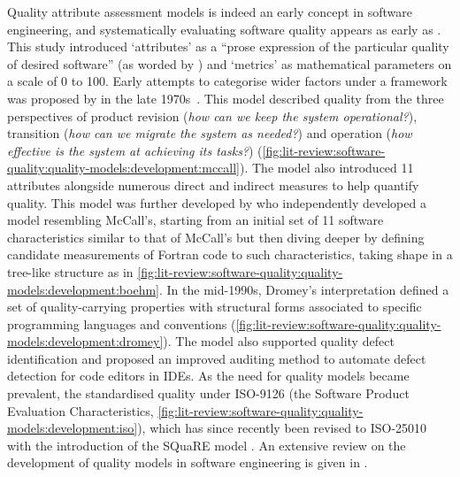 Quality attribute assessment models is indeed an early concept in software engineering, and systematically evaluating software quality appears as early as \citeyear{Rubey:1968fg} \citep{Rubey:1968fg}. This study introduced `attributes' as a ``prose expression of the particular quality of desired software'' (as worded by \citet{Boehm:1978vv}) and `metrics' as mathematical parameters on a scale of 0 to 100. 
Early attempts to categorise wider factors under a framework was proposed by \citeauthor*{McCall:1977uy} in the late 1970s~\citep{McCall:1977wm,Cavano:1978gz}. This model described quality from the three perspectives of product revision (\textit{how can we keep the system operational?}), transition (\textit{how can we migrate the system as needed?}) and operation (\textit{how effective is the system at achieving its tasks?}) (\cref{fig:lit-review:software-quality:quality-models:development:mccall}). The model also introduced 11 attributes alongside numerous direct and indirect measures to help quantify quality.
This model was further developed by \citet{Boehm:1978vv} who independently developed a model resembling McCall's, starting from an initial set of 11 software characteristics similar to that of McCall's but then diving deeper by defining candidate measurements of Fortran code to such characteristics, taking shape in a tree-like structure as in \cref{fig:lit-review:software-quality:quality-models:development:boehm}. 
In the mid-1990s, Dromey's interpretation \citep{Dromey:1995wy} defined a set of quality-carrying properties with structural forms associated to specific programming languages and conventions (\cref{fig:lit-review:software-quality:quality-models:development:dromey}). The model also supported quality defect identification and proposed an improved auditing method to automate defect detection for code editors in IDEs. 
As the need for quality models became prevalent, the \citeauthor{ISO9126:1999} standardised quality under ISO-9126 \citep{ISO9126:1999} (the Software Product Evaluation Characteristics, \cref{fig:lit-review:software-quality:quality-models:development:iso}), which has since recently been revised to ISO-25010 with the introduction of the \gls{SQuaRE} model \citep{ISO25010:2011}.
An extensive review on the development of quality models in software engineering is given in \citep{AlQutaish:2010vua}.

